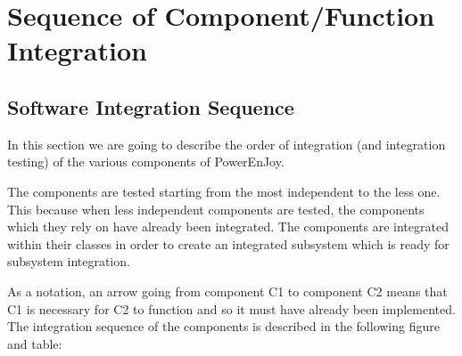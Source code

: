\section{Sequence of Component/Function Integration}
\subsection{Software Integration Sequence}
In this section we are going to describe the order of integration (and integration
testing) of the various components of PowerEnJoy.

The components are tested starting from the most independent to the less
one. This because when less independent components are tested, the components which
they rely on have already been integrated. The components are integrated
within their classes in order to create an integrated subsystem which is ready
for subsystem integration.

As a notation, an arrow going from component C1 to component C2 means that C1 is necessary for C2 to function and so it must have already been implemented.
The integration sequence of the components is described in the following figure and table:



